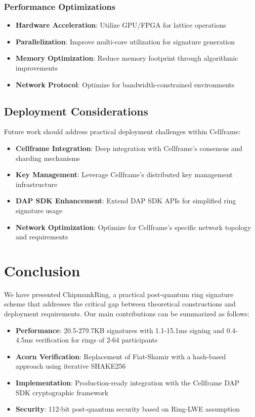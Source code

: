 \documentclass[11pt,a4paper]{article}
\begin{document}
\subsubsection{Performance Optimizations}

\begin{itemize}
\item \textbf{Hardware Acceleration}: Utilize GPU/FPGA for lattice operations
\item \textbf{Parallelization}: Improve multi-core utilization for signature generation
\item \textbf{Memory Optimization}: Reduce memory footprint through algorithmic improvements
\item \textbf{Network Protocol}: Optimize for bandwidth-constrained environments
\end{itemize}

\subsection{Deployment Considerations}

Future work should address practical deployment challenges within Cellframe:

\begin{itemize}
\item \textbf{Cellframe Integration}: Deep integration with Cellframe's consensus and sharding mechanisms
\item \textbf{Key Management}: Leverage Cellframe's distributed key management infrastructure
\item \textbf{DAP SDK Enhancement}: Extend DAP SDK APIs for simplified ring signature usage
\item \textbf{Network Optimization}: Optimize for Cellframe's specific network topology and requirements
\end{itemize}

\section{Conclusion}

We have presented ChipmunkRing, a practical post-quantum ring signature scheme that addresses the critical gap between theoretical constructions and deployment requirements. Our main contributions can be summarized as follows:

\begin{itemize}
\item \textbf{Performance}: 20.5-279.7KB signatures with 1.1-15.1ms signing and 0.4-4.5ms verification for rings of 2-64 participants
\item \textbf{Acorn Verification}: Replacement of Fiat-Shamir with a hash-based approach using iterative SHAKE256
\item \textbf{Implementation}: Production-ready integration with the Cellframe DAP SDK cryptographic framework
\item \textbf{Security}: 112-bit post-quantum security based on Ring-LWE assumption
\end{itemize}
\end{document}

